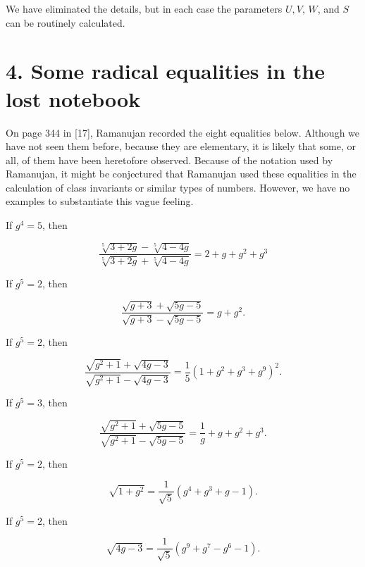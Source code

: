 \documentclass[11pt,letterpaper]{article}
\begin{document}
We have eliminated the details, but in each case the parameters $U, V$, $W$, and $S$ can be routinely calculated.


\section*{4. Some radical equalities in the lost notebook}
On page 344 in [17], Ramanujan recorded the eight equalities below. Although we have not seen them before, because they are elementary, it is likely that some, or all, of them have been heretofore observed. Because of the notation used by Ramanujan, it might be conjectured that Ramanujan used these equalities in the calculation of class invariants or similar types of numbers. However, we have no examples to substantiate this vague feeling.

If $g^{4}=5$, then


\begin{equation*}
\frac{\sqrt[5]{3+2 g}-\sqrt[5]{4-4 g}}{\sqrt[5]{3+2 g}+\sqrt[5]{4-4 g}}=2+g+g^{2}+g^{3} \tag{4.1}\label{eq:4.1}
\end{equation*}


If $g^{5}=2$, then


\begin{equation*}
\frac{\sqrt{g+3}+\sqrt{5 g-5}}{\sqrt{g+3}-\sqrt{5 g-5}}=g+g^{2} . \tag{4.2}\label{eq:4.2}
\end{equation*}


If $g^{5}=2$, then


\begin{equation*}
\frac{\sqrt{g^{2}+1}+\sqrt{4 g-3}}{\sqrt{g^{2}+1}-\sqrt{4 g-3}}=\frac{1}{5}\left(1+g^{2}+g^{3}+g^{9}\right)^{2} . \tag{4.3}\label{eq:4.3}
\end{equation*}


If $g^{5}=3$, then


\begin{equation*}
\frac{\sqrt{g^{2}+1}+\sqrt{5 g-5}}{\sqrt{g^{2}+1}-\sqrt{5 g-5}}=\frac{1}{g}+g+g^{2}+g^{3} . \tag{4.4}\label{eq:4.4}
\end{equation*}


If $g^{5}=2$, then


\begin{equation*}
\sqrt{1+g^{2}}=\frac{1}{\sqrt{5}}\left(g^{4}+g^{3}+g-1\right) . \tag{4.5}\label{eq:4.5}
\end{equation*}


If $g^{5}=2$, then


\begin{equation*}
\sqrt{4 g-3}=\frac{1}{\sqrt{5}}\left(g^{9}+g^{7}-g^{6}-1\right) . \tag{4.6}\label{eq:4.6}
\end{equation*}
\end{document}
